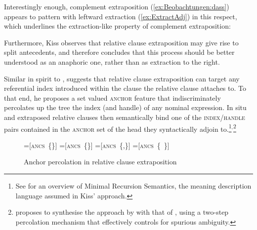 \documentclass[output=paper,biblatex,babelshorthands,newtxmath,draftmode,colorlinks,citecolor=brown]{langscibook}
\begin{document}
Interestingly enough, complement extraposition (\ref{ex:Beobachtungen:dass}) appears to pattern with
leftward extraction (\ref{ex:ExtractAdj}) in this respect, which underlines the
extraction-like property of complement extraposition:

\z

Furthermore, Kiss observes that relative clause extraposition may give
rise to split antecedents, and therefore concludes that this process
should be better understood as an anaphoric one, rather than as
extraction to the right. 

Similar in spirit to \citet{culicover90:_extrap_and_compl_princ},
\citet{kiss_t02nllt} suggests that relative clause extraposition can
target any referential index introduced within the clause the relative {clause}
attaches to.  To that end, he proposes a set valued \textsc{anchor}
feature that indiscriminately percolates up the tree the index (and
handle) of any nominal expression. In situ and extraposed relative
clauses then semantically bind one of the \textsc{index/handle} pairs
contained in the \textsc{anchor} set of the head they syntactically
adjoin to.\footnote{See
  for an overview of Minimal Recursion Semantics, the meaning
  description language assumed in Kiss'
  approach.}$^,$\footnote{\citet{crysmann_b04rlc} proposes to
  synthesise the approach by \citet{kiss_t02nllt} with that of
  \citet{Keller:95}, using a two-step percolation mechanism that
  effectively controls for spurious ambiguity.}

\begin{figure}
  
  { \newbox\onebox \newbox\twobox \newbox\onetwobox \newbox\emptybox

    \setbox\onebox=\hbox{[\textsc{ancs} \{\}]}
    \setbox\twobox=\hbox{[\textsc{ancs} \{\}]}
    \setbox\onetwobox=\hbox{[\textsc{ancs} \{,\}]}
    \setbox\emptybox=\hbox{[\textsc{ancs} \{ \}]}
}
\caption{Anchor percolation in relative clause extraposition \citep{Kiss2005a}}
\end{figure}
\end{document}
